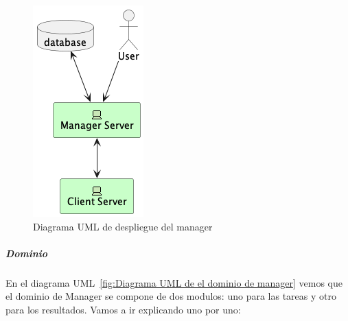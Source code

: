 \begin{figure}[H]
    \centering
    \includegraphics[height=0.4\textheight]{./part/Proyecto_ejecutivo/memoria_descriptiva/descripcionDelProyecto/manager/uml/managerServerConcept}
    \caption{Diagrama UML de despliegue del manager}\label{fig:Diagrama UML de despliegue del manager}
\end{figure}

\subparagraph{Dominio}

En el diagrama UML~\cref{fig:Diagrama UML de el dominio de manager} vemos que el dominio de Manager se compone de dos modulos: uno para las tareas y otro para los resultados. Vamos a ir explicando uno por uno:


